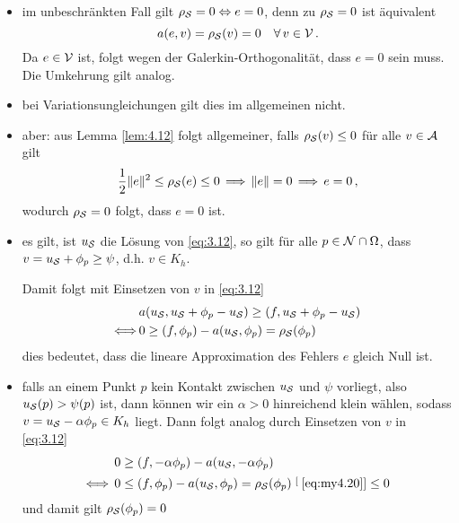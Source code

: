 \begin{itemize}
\begin{proof}
Die Behauptung folgt direkt aus Lemma \ref{lem:4.14} zusammen mit
\[
	\Omega = \bigcup_{p\in \mcal N} \omega_p \, , \quad \mcal E = \bigcup_{p \in \mcal N} \mcal E_p \quad \text{und}\quad \sum_{p \in \mcal N} \phi_p = 1 \, 
\]
durch einfaches Nachrechnen.
\end{proof}

\item im unbeschränkten Fall gilt $\rho_{\mathcal S} = 0 \Leftrightarrow e = 0$, denn zu $\rho_{\mathcal S} = 0$ ist äquivalent
\[
	a(e,v) = \rho_{\mathcal S}(v) = 0 \quad \forall \, v \in \mathcal V\, .
\]
Da $e\in \mathcal V$ ist, folgt wegen der Galerkin-Orthogonalität, dass $e=0$ sein muss. Die Umkehrung gilt analog.

\item bei Variationsungleichungen gilt dies im allgemeinen nicht.

\item aber: aus Lemma \ref{lem:4.12} folgt allgemeiner, falls $\rho_{\mathcal S} (v) \le 0$ für alle $v \in \mathcal A$ gilt
\[
	\frac 12 \lVert e\rVert^2 \le \rho_{\mathcal S}(e) \le 0\,  \Longrightarrow\,  \lVert e\rVert = 0 \, \Longrightarrow\, e = 0 \, ,
\]
wodurch $\rho_{\mathcal S} = 0$ folgt, dass $e = 0$ ist.

\item es gilt, ist $u_{\mathcal S}$ die Lösung von \eqref{eq:3.12}, so gilt für alle $p \in \mathcal N \cap \Omega$, dass $v = u_{\mathcal S} + \phi_p  \ge \psi$, d.h. $v \in K_h$.

Damit folgt mit Einsetzen von $v$ in  \eqref{eq:3.12}
\begin{align}\notag
	&a(u_{\mathcal S}, u_{\mathcal S} + \phi_p - u_{\mathcal S}) \ge (f,u_{\mathcal S}+\phi_p-u_{\mathcal S}) \\
	\label{eq:my4.20}
	\Longleftrightarrow \,  & 0 \ge (f,\phi_p)-a(u_{\mathcal S},\phi_p) = \rho_{\mathcal S}(\phi_p)
\end{align}
dies bedeutet, dass die lineare Approximation des Fehlers $e$ gleich Null ist.

\item falls an einem Punkt $p$ kein Kontakt zwischen $u_{\mathcal S}$ und $\psi$ vorliegt, also $u_{\mathcal S} (p) > \psi(p)$ ist, dann können wir ein $\alpha > 0$ hinreichend klein wählen, sodass $v = u_{\mathcal S} - \alpha \phi_p \in K_h$ liegt. Dann folgt analog durch Einsetzen von $v$ in \eqref{eq:3.12}
\begin{align*}
	0 & \ge (f,-\alpha \phi_p) - a(u_{\mathcal S},-\alpha\phi_p) \\
	\Longleftrightarrow \, 0 & \le (f,\phi_p) - a(u_{\mathcal S},\phi_p) = \rho_{\mathcal S} (\phi_p) \stackrel[\scriptsize\eqref{eq:my4.20}]{}\le 0
\end{align*}
und damit gilt $\rho_{\mathcal S} (\phi_p) = 0$


\end{itemize}
